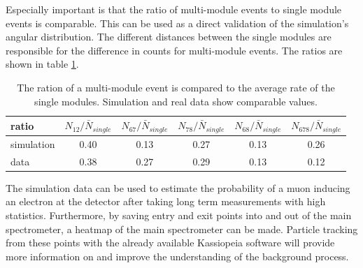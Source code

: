   Especially important is that the ratio of multi-module events to single module events is comparable. This can be used as a direct validation of the simulation's angular distribution. The different distances between the single modules are responsible for the difference in counts for multi-module events.
  The ratios are shown in table \ref{ratioSingleMulti}.
  \begin{table}
  \centering
  \caption[Single \& Multi side Event Ratio]{The ration of a multi-module event is compared to the average rate of the single modules. Simulation and real data show comparable values.}
  \label{ratioSingleMulti}
  \begin{tabular}{|l|c|c|c|c|c|}
  
  \hline
  	\rule{0pt}{4ex} ratio &$N_{12}/\bar N_{single} $&$ N_{67}/\bar N_{single}$ & $N_{78}/\bar N_{single} $& $N_{68}/\bar N_{single} $& $N_{678}/\bar N_{single}$\\
  	\hline
	simulation & 0.40 & 0.13 & 0.27 & 0.13 & 0.26\\
	 data & 0.38 & 0.27 & 0.29 & 0.13 & 0.12 \\
	\hline
  	\end{tabular}
  	
  \end{table}

  The simulation data can be used to estimate the probability of a muon inducing an electron at the detector after taking long term measurements with high statistics.
  Furthermore, by saving entry and exit points into and out of the main spectrometer, a heatmap of the main spectrometer can be made. Particle tracking from these points with the already available Kassiopeia software will provide more information on and improve the understanding of the background process.
  
  
  
  
  
